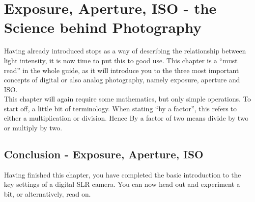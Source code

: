 \chapter{Exposure, Aperture, ISO - the Science behind Photography}
\label{chap:Aperture-Exposure-ISO}

Having already introduced \glspl{stop} as a way of describing the relationship between light intensity, it is now time to put this to good use. This chapter is a ``must read'' in the whole guide, as it will introduce you to the three most important concepts of digital or also analog photography, namely \gls{exposure}, \gls{aperture} and \gls{ISO}.
\\
This chapter will again require some mathematics, but only simple operations. To start off, a little bit of terminology. When stating ``by a factor'', this refers to either a multiplication or division. Hence By a factor of two means divide by two or multiply by two.







\section{Conclusion - Exposure, Aperture, ISO}

Having finished this chapter, you have completed the basic introduction to the key settings of a digital \gls{SLR} camera. You can now head out and experiment a bit, or alternatively, read on.